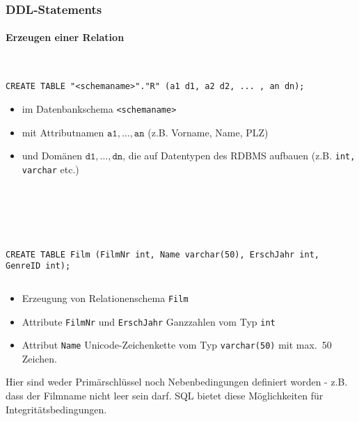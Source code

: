 \begin{frame}[fragile]\frametitle{DDL-Statements}
\framesubtitle{Erzeugen einer Relation}
\\[4pt]
\lstset{language=sql}
\begin{lstlisting}[numbers=none]
CREATE TABLE "<schemaname>"."R" (a1 d1, a2 d2, ... , an dn);
\end{lstlisting}
\begin{itemize}
\item im Datenbankschema \texttt{<schemaname>}
\item mit Attributnamen $\texttt{a1},\dots,\texttt{an}$ (z.B. Vorname, Name, PLZ)
\item und Dom\"anen $\texttt{d1},\dots,\texttt{dn}$, die auf Datentypen des RDBMS aufbauen 
(z.B. \texttt{int, varchar} etc.)
\end{itemize}
\abs\ \abs 
{}
\end{frame}

\begin{frame}[fragile]\frametitle{\insertsection}
\framesubtitle{\insertsubsection}
\\[4pt]
\begin{columns}
\begin{column}{0.9\textwidth}
	\lstset{language=sql}
\begin{lstlisting}[numbers=none]
CREATE TABLE Film (FilmNr int, Name varchar(50), ErschJahr int, GenreID int);
\end{lstlisting}
\end{column}
\end{columns}
\abs
\begin{itemize}
\item Erzeugung von Relationenschema \texttt{Film}
\item Attribute \texttt{FilmNr} und \texttt{ErschJahr} Ganzzahlen vom Typ \texttt{int}
\item	Attribut \texttt{Name} Unicode-Zeichenkette vom Typ \texttt{varchar(50)} mit max.~50 Zeichen.
\end{itemize}
\abs
\alert{Hier sind weder Prim\"arschl\"ussel noch Nebenbedingungen definiert worden - z.B. dass der Filmname nicht leer sein darf.
SQL bietet diese M\"oglichkeiten f\"ur Integrit\"atsbedingungen.}
\end{frame}

